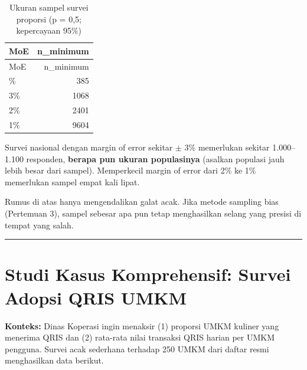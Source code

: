 \documentclass[
  indonesian,
  letterpaper,
]{book}
\begin{document}
\begin{longtable}[]{@{}lr@{}}
\caption{Ukuran sampel survei proporsi (p = 0,5; kepercayaan
95\%)}\tabularnewline
\toprule\noalign{}
MoE & n\_minimum \\
\midrule\noalign{}
\endfirsthead
\toprule\noalign{}
MoE & n\_minimum \\
\midrule\noalign{}
\endhead
\bottomrule\noalign{}
\endlastfoot
5\% & 385 \\
3\% & 1068 \\
2\% & 2401 \\
1\% & 9604 \\
\end{longtable}

Survei nasional dengan margin of error sekitar \(\pm\) 3\% memerlukan
sekitar 1.000--1.100 responden, \textbf{berapa pun ukuran populasinya}
(asalkan populasi jauh lebih besar dari sampel). Memperkecil margin of
error dari 2\% ke 1\% memerlukan sampel empat kali lipat.

\begin{tcolorbox}[enhanced jigsaw, arc=.35mm, bottomrule=.15mm, bottomtitle=1mm, breakable, colback=white, colbacktitle=quarto-callout-warning-color!10!white, colframe=quarto-callout-warning-color-frame, coltitle=black, left=2mm, leftrule=.75mm, opacityback=0, opacitybacktitle=0.6, rightrule=.15mm, title=\textcolor{quarto-callout-warning-color}{\faExclamationTriangle}\hspace{0.5em}{Ukuran sampel tidak menyembuhkan bias}, titlerule=0mm, toprule=.15mm, toptitle=1mm]

Rumus di atas hanya mengendalikan galat acak. Jika metode sampling bias
(Pertemuan 3), sampel sebesar apa pun tetap menghasilkan selang yang
presisi di tempat yang salah.

\end{tcolorbox}

\begin{center}\rule{0.5\linewidth}{0.5pt}\end{center}


\chapter{Studi Kasus Komprehensif: Survei Adopsi QRIS
UMKM}\label{studi-kasus-komprehensif-survei-adopsi-qris-umkm}

\textbf{Konteks:} Dinas Koperasi ingin menaksir (1) proporsi UMKM
kuliner yang menerima QRIS dan (2) rata-rata nilai transaksi QRIS harian
per UMKM pengguna. Survei acak sederhana terhadap 250 UMKM dari daftar
resmi menghasilkan data berikut.
\end{document}
